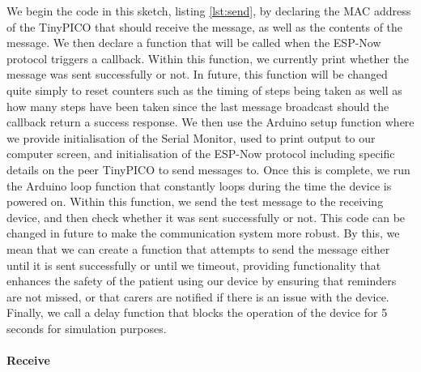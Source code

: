 {We begin the code in this sketch, listing \ref{lst:send}, by declaring the MAC address of the TinyPICO that should receive the message, as well as the contents of the message. We then declare a function that will be called when the ESP-Now protocol triggers a callback. Within this function, we currently print whether the message was sent successfully or not. In future, this function will be changed quite simply to reset counters such as the timing of steps being taken as well as how many steps have been taken since the last message broadcast should the callback return a success response. We then use the Arduino setup function where we provide initialisation of the Serial Monitor, used to print output to our computer screen, and initialisation of the ESP-Now protocol including specific details on the peer TinyPICO to send messages to. Once this is complete, we run the Arduino loop function that constantly loops during the time the device is powered on. Within this function, we send the test message to the receiving device, and then check whether it was sent successfully or not. This code can be changed in future to make the communication system more robust. By this, we mean that we can create a function that attempts to send the message either until it is sent successfully or until we timeout, providing functionality that enhances the safety of the patient using our device by ensuring that reminders are not missed, or that carers are notified if there is an issue with the device. Finally, we call a delay function that blocks the operation of the device for 5 seconds for simulation purposes.

\paragraph{Receive}



}
